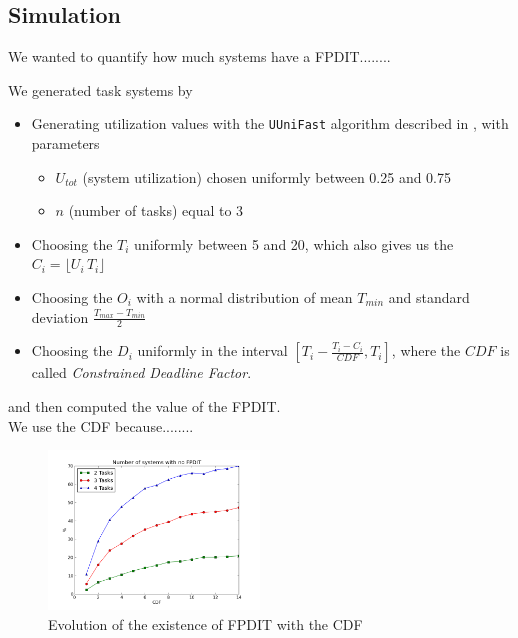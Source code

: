 \documentclass[times, 10pt,twocolumn, a4paper]{article}
\begin{document}
	\subsection{Simulation}

	We wanted to quantify how much systems have a FPDIT........

	We generated task systems by
	\begin{itemize}
		\item Generating utilization values with the \texttt{UUniFast} algorithm described in \cite{bini2005measuring}, with parameters
		\begin{itemize}
			\item $U_{tot}$ (system utilization) chosen uniformly between 0.25 and 0.75
			\item $n$ (number of tasks) equal to 3
		\end{itemize}
		\item Choosing the $T_i$ uniformly between 5 and 20, which also gives us the $C_i = \lfloor U_i \, T_i \rfloor$
		\item Choosing the $O_i$ with a normal distribution of mean $T_{min}$ and standard deviation $\frac{T_{max} - T_{min}}{2}$
		\item Choosing the $D_i$ uniformly in the interval $[T_i - \frac{T_i - C_i}{CDF}, T_i]$, where the $CDF$ is called \emph{Constrained Deadline Factor}.
	\end{itemize}
	and then computed the value of the FPDIT.\\

	We use the CDF because........\\

	\begin{figure}[h]
	\begin{center}
		\includegraphics[width=0.5\textwidth]{python-simulation/plots/nofpdit.png}
	\end{center}
	\caption{Evolution of the existence of FPDIT with the CDF}
	\label{fig:noFPDIT}
	\end{figure}
\end{document}
